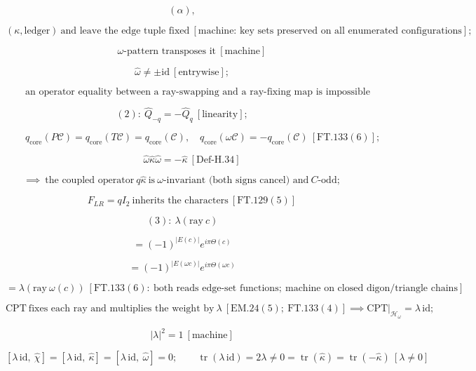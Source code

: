 \begin{theorem}
\[
(\alpha),
\]

\[
(\kappa,\text{ledger})\ \text{and leave the edge tuple fixed}\ [\text{machine: key sets preserved on all enumerated configurations}];
\]

\[
\qquad \omega\text{-pattern transposes it}\ [\text{machine}]
\]

\[
\hat\omega\ne\pm\mathrm{id}\ [\text{entrywise}];
\]

\[
\qquad \text{an operator equality between a ray-swapping and a ray-fixing map is impossible}
\]

\[
(2):\ \hat Q_{-q}=-\hat Q_q\ [\text{linearity}];
\]

\[
\qquad q_{\mathrm{core}}(P\mathcal C)=q_{\mathrm{core}}(T\mathcal C)=q_{\mathrm{core}}(\mathcal C),\quad q_{\mathrm{core}}(\omega\mathcal C)=-q_{\mathrm{core}}(\mathcal C)\ [\mathrm{FT.133}(6)];
\]

\[
\qquad \hat\omega\hat\kappa\hat\omega=-\hat\kappa\ [\mathrm{Def\text{-}H.34}]
\]

\[
\implies\ \text{the coupled operator}\ q\hat\kappa\ \text{is}\ \omega\text{-invariant (both signs cancel) and}\ C\text{-odd};
\]

\[
\qquad F_{LR}=qI_2\ \text{inherits the characters}\ [\mathrm{FT.129}(5)]
\]

\[
(3):\ \lambda(\text{ray}\ c)
\]

\[
= (-1)^{|E(c)|}e^{i\pi\Theta(c)}
\]

\[
= (-1)^{|E(\omega c)|}e^{i\pi\Theta(\omega c)}
\]

\[
= \lambda(\text{ray}\ \omega(c))\ [\mathrm{FT.133}(6):\ \text{both reads edge-set functions};\ \text{machine on closed digon/triangle chains}]
\]

\[
\mathrm{CPT}\ \text{fixes each ray and multiplies the weight by}\ \lambda\ [\mathrm{EM.24}(5);\ \mathrm{FT.133}(4)]\implies\mathrm{CPT}\big|_{\mathcal H_\omega}=\lambda\,\mathrm{id};
\]

\[
\qquad |\lambda|^2=1\ [\text{machine}]
\]

\[
[\lambda\,\mathrm{id},\ \hat\chi]=[\lambda\,\mathrm{id},\ \hat\kappa]=[\lambda\,\mathrm{id},\ \hat\omega]=0;\qquad\operatorname{tr}(\lambda\,\mathrm{id})=2\lambda\ne0=\operatorname{tr}(\hat\kappa)=\operatorname{tr}(-\hat\kappa)\ [\lambda\ne0]
\]


\end{theorem}
